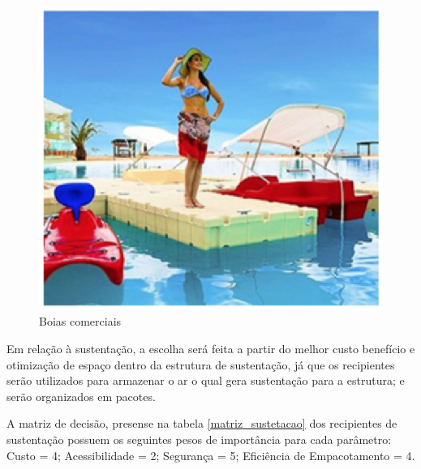 \begin{figure}[H]
 \centering
   \includegraphics[keepaspectratio=true,scale=0.8]{figuras/boias.eps}
 \caption{Boias comerciais}
 \label{Boias_cormercias}
\end{figure}

Em relação à sustentação, a escolha será feita a partir do melhor custo benefício e otimização de espaço dentro da estrutura de sustentação, já que os recipientes serão utilizados para armazenar o ar o qual gera sustentação para a estrutura; e serão organizados em pacotes.

A matriz de decisão, presense na tabela \ref{matriz_sustetacao} dos recipientes de sustentação possuem os seguintes pesos de importância para cada parâmetro: Custo = 4; Acessibilidade = 2; Segurança = 5; Eficiência de Empacotamento = 4.

